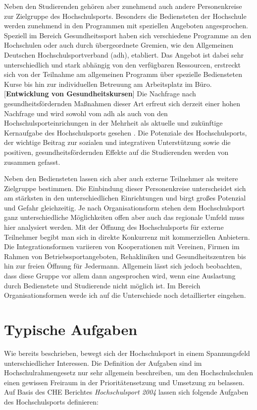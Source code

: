 Neben den Studierenden gehören aber zunehmend auch andere Personenkreise zur Zielgruppe des Hochschulsports. Besonders die Bediensteten der Hochschule werden zunehmend in den Programmen mit speziellen Angeboten angesprochen. Speziell im Bereich Gesundheitssport haben sich verschiedene Programme an den Hochschulen oder auch durch übergeordnete Gremien, wie den Allgemeinen Deutschen Hochschulsportverband (adh), etabliert. Das Angebot ist dabei sehr unterschiedlich und stark abhängig von den verfügbaren Ressourcen, erstreckt sich von der Teilnahme am allgemeinen Programm über spezielle Bediensteten Kurse bis hin zur individuellen Betreuung am Arbeitsplatz im Büro. [\textbf{Entwicklung von Gesundheitskursen}] Die Nachfrage nach gesundheitsfördernden Maßnahmen dieser Art erfreut sich derzeit einer hohen Nachfrage und wird sowohl vom adh als auch von den Hochschulsporteinrichungen in der Mehrheit als aktuelle und zukünftige Kernaufgabe des Hochschulsports gesehen \cite[vgl.][]{Baumgarten.2009}.
Die Potenziale des Hochschulsports, der wichtige Beitrag zur sozialen und integrativen Unterstützung sowie die positiven, gesundheitsfördernden Effekte auf die Studierenden werden von \cite{Goring.2010} zusammen gefasst. 

Neben den Bediensteten lassen sich aber auch externe Teilnehmer als weitere Zielgruppe bestimmen. Die Einbindung dieser Personenkreise unterscheidet sich am stärksten in den unterschiedlichen Einrichtungen und birgt großes Potenzial und Gefahr gleichzeitig. Je nach Organisationsform stehen dem Hochschulsport ganz unterschiedliche Möglichkeiten offen aber auch das regionale Umfeld muss hier analysiert werden. Mit der Öffnung des Hochschulsports für externe Teilnehmer begibt man sich in direkte Konkurrenz mit kommerziellen Anbietern. Die Integrationsformen variieren von Kooperationen mit Vereinen, Firmen im Rahmen von Betriebssportangeboten, Rehakliniken und Gesundheitszentren bis hin zur freien Öffnung für Jedermann. Allgemein lässt sich jedoch beobachten, dass diese Gruppe vor allem dann angesprochen wird, wenn eine Auslastung durch Bedienstete und Studierende nicht möglich ist. Im Bereich Organisationsformen werde ich auf die Unterschiede noch detaillierter eingehen.  
\section{Typische Aufgaben}
Wie bereits beschrieben, bewegt sich der Hochschulsport in einem Spannungsfeld unterschiedlicher Interessen. Die Definition der Aufgaben sind im Hochschulrahmengesetz \cite{BundsministeriumderJustizundfurVerbracherschutz.1976} nur sehr allgemein beschreiben, um den Hochschulschulen einen gewissen Freiraum in der Prioritätensetzung und Umsetzung zu belassen. Auf Basis des CHE Berichtes \textit{Hochschulsport 2004} \cite*[vgl. ][S.26f]{Hachmeister.2004} lassen sich folgende Aufgaben des Hochschulsports definieren:

